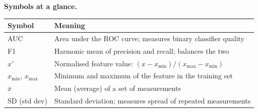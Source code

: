 \documentclass[a4paper,11pt]{article}
\begin{document}
\medskip
\noindent\textbf{Symbols at a glance.}
\begin{center}\small
\begin{tabular}{@{}ll@{}}
\toprule
\textbf{Symbol} & \textbf{Meaning} \\
\midrule
AUC & Area under the ROC curve; measures binary classifier quality \\
F1 & Harmonic mean of precision and recall; balances the two \\
$x'$ & Normalised feature value: $(x - x_{\min})/(x_{\max} - x_{\min})$ \\
$x_{\min},\, x_{\max}$ & Minimum and maximum of the feature in the training set \\
$\bar{x}$ & Mean (average) of a set of measurements \\
SD (std dev) & Standard deviation; measures spread of repeated measurements \\
\bottomrule
\end{tabular}
\end{center}
\end{document}
